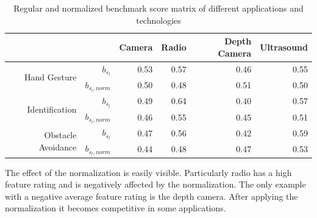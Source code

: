 \begin{table}[htbp]
  \centering
  \caption{Regular and normalized benchmark score matrix of different applications and technologies}
    \begin{tabular}{rrrrrr}
    \toprule
          &       & Camera & Radio & Depth Camera & Ultrasound \\
    \midrule
    \multirow{2}[0]{*}{Hand Gesture} & $b_{s_l}$ & 0.53  & 0.57  & 0.46  & 0.55 \\
          & $b_{s_l,norm}$ & 0.50  & 0.48  & 0.51  & 0.50 \\
          \midrule
    \multirow{2}[0]{*}{Identification} & $b_{s_l}$ & 0.49  & 0.64  & 0.40  & 0.57 \\
          & $b_{s_l,norm}$ & 0.46  & 0.55  & 0.45  & 0.51 \\
          \midrule
    \multirow{2}[0]{*}{Obstacle Avoidance} & $b_{s_l}$ & 0.47  & 0.56  & 0.42  & 0.59 \\
          & $b_{s_l,norm}$ & 0.44  & 0.48  & 0.47  & 0.53 \\
    \bottomrule
    \end{tabular}%
  \label{tab:bench_scores}%
\end{table}%
The effect of the normalization is easily visible. Particularly radio has a high feature rating and is negatively affected by the normalization. The only example with a negative average feature rating is the depth camera. After applying the normalization it becomes competitive in some applications.


